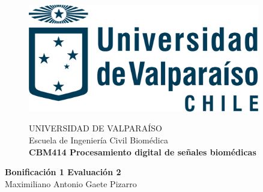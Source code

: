 \documentclass[10pt]{article}
\theoremstyle{definition}
\theoremstyle{remark}
\theoremstyle{definition}
\numberwithin{equation}{prob}
\begin{document}
	
	\begin{titlepage}
		
		
		\begin{figure}
			\begin{minipage}{4cm}
				\includegraphics[width=0.9\textwidth]{./figures/logo}
			\end{minipage}
			\begin{minipage}{11cm}
				\vspace{4mm}
				{\sc UNIVERSIDAD DE VALPARAÍSO}\\
				Escuela de Ingeniería Civil Biomédica\\
				{\bf CBM414 Procesamiento digital de señales biomédicas}\\
				\vspace{0mm}
				\hrulefill
			\end{minipage}
		\end{figure}
		\phantom{""}\vspace{60mm}
		
		
		\begin{center}
			\Huge{\textbf{Bonificación 1 Evaluación 2}}\vspace{95mm}\\
			\raggedleft \Large{Maximiliano Antonio Gaete Pizarro}\\ 
		\end{center}
		
		
	\end{titlepage}
	
\printindex
\end{document}
